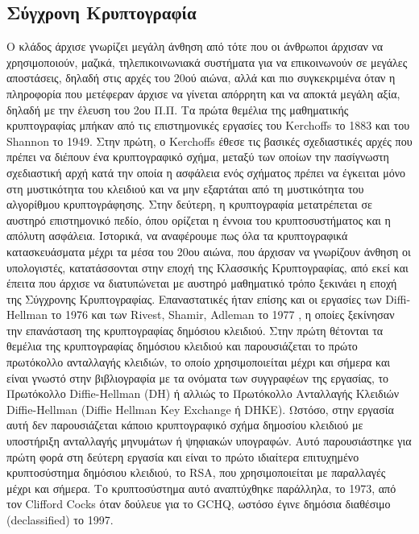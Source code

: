 \subsection{Σύγχρονη Κρυπτογραφία}
Ο κλάδος άρχισε γνωρίζει μεγάλη άνθηση από τότε που οι άνθρωποι άρχισαν να χρησιμοποιούν, μαζικά, τηλεπικοινωνιακά συστήματα για να επικοινωνούν σε μεγάλες αποστάσεις, δηλαδή στις αρχές του 20ού αιώνα, αλλά και πιο συγκεκριμένα όταν η πληροφορία που μετέφεραν άρχισε να γίνεται απόρρητη και να αποκτά μεγάλη αξία, δηλαδή με την έλευση του 2ου Π.Π. Τα πρώτα θεμέλια της μαθηματικής κρυπτογραφίας μπήκαν από τις επιστημονικές εργασίες του Kerchoffs \cite{kerckhoffs1883cryptographie} το 1883 και του Shannon \cite{shannon1945mathematical} το 1949. Στην πρώτη, ο Kerchoffs έθεσε τις βασικές σχεδιαστικές αρχές που πρέπει να διέπουν ένα κρυπτογραφικό σχήμα, μεταξύ των οποίων την πασίγνωστη σχεδιαστική αρχή κατά την οποία η ασφάλεια ενός σχήματος πρέπει να έγκειται μόνο στη μυστικότητα του κλειδιού και να μην εξαρτάται από τη μυστικότητα του αλγορίθμου κρυπτογράφησης. Στην δεύτερη, η κρυπτογραφία μετατρέπεται σε αυστηρό επιστημονικό πεδίο, όπου ορίζεται η έννοια του κρυπτοσυστήματος και η απόλυτη ασφάλεια. Ιστορικά, να αναφέρουμε πως όλα τα κρυπτογραφικά κατασκευάσματα μέχρι τα μέσα του 20ου αιώνα, που άρχισαν να γνωρίζουν άνθηση οι υπολογιστές, κατατάσσονται στην εποχή της Κλασσικής Κρυπτογραφίας, από εκεί και έπειτα που άρχισε να διατυπώνεται με αυστηρό μαθηματικό τρόπο ξεκινάει η εποχή της Σύγχρονης Κρυπτογραφίας. Επαναστατικές ήταν επίσης και οι εργασίες των Diffi-Hellman \cite{10.1109/TIT.1976.1055638} το 1976 και των Rivest, Shamir, Adleman το 1977 \cite{10.1145/359340.359342}, η οποίες ξεκίνησαν την επανάσταση της κρυπτογραφίας δημόσιου κλειδιού. Στην πρώτη θέτονται τα θεμέλια της κρυπτογραφίας δημόσιου κλειδιού και παρουσιάζεται το πρώτο πρωτόκολλο ανταλλαγής κλειδιών, το οποίο χρησιμοποιείται μέχρι και σήμερα και είναι γνωστό στην βιβλιογραφία με τα ονόματα των συγγραφέων της εργασίας, το Πρωτόκολλο Diffie-Hellman (DH) ή αλλιώς το Πρωτόκολλο Ανταλλαγής Κλειδιών Diffie-Hellman (Diffie Hellman Key Exchange ή DHKE). Ωστόσο, στην εργασία αυτή δεν παρουσιάζεται κάποιο κρυπτογραφικό σχήμα δημοσίου κλειδιού με υποστήριξη ανταλλαγής μηνυμάτων ή ψηφιακών υπογραφών. Αυτό παρουσιάστηκε για πρώτη φορά στη δεύτερη εργασία και είναι το πρώτο ιδιαίτερα επιτυχημένο κρυπτοσύστημα δημόσιου κλειδιού, το RSA, που χρησιμοποιείται με παραλλαγές μέχρι και σήμερα. Το κρυπτοσύστημα αυτό αναπτύχθηκε παράλληλα, το 1973, από τον Clifford Cocks όταν δούλευε για το GCHQ, ωστόσο έγινε δημόσια διαθέσιμο (declassified) το 1997.

